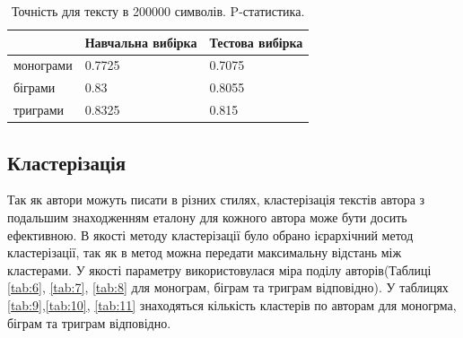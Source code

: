 \documentclass[12pt, a4paper]{extarticle}
\begin{document}
\begin{center}
\begin{table}
\begin{tabular}{|p{5em}|p{10em}|p{10em}|}
\hline
& Навчальна вибірка & Тестова вибірка\\
\hline
монограми & 0.7725 & 0.7075\\
біграми & 0.83 & 0.8055\\
триграми & 0.8325 & 0.815\\
\hline
\end{tabular}
\caption{Точність для тексту в 200000 символів. P-статистика.}
\label{tab:5}
\end{table}
\end{center}
\subsection{Кластерізація}
Так як автори можуть писати в різних стилях, кластерізація текстів автора з подальшим знаходженням еталону для кожного автора може бути досить ефективною. В якості методу кластерізації було обрано ієрархічний метод кластерізації, так як в метод можна передати максимальну відстань між кластерами. У якості параметру використовулася міра поділу авторів(Таблиці \ref{tab:6}, \ref{tab:7}, \ref{tab:8} для монограм, біграм та триграм відповідно). У таблицях \ref{tab:9},\ref{tab:10}, \ref{tab:11} знаходяться кількість кластерів по  авторам для моногрма, біграм та триграм відповідно.
\end{document}
